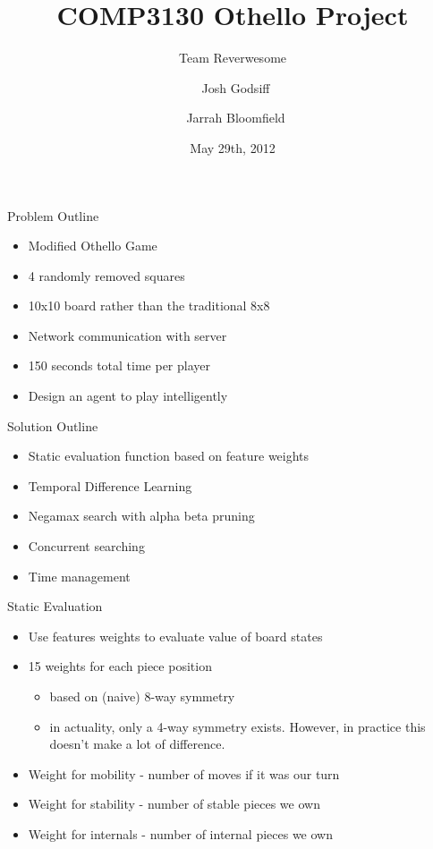 \documentclass{beamer}
\title[Team Reverwesome: Othello Bot] %
{COMP3130 Othello Project}
\subtitle
{Team Reverwesome} %
\author[Josh Godsiff, Jarrah Bloomfield] %
{~Josh Godsiff \and ~Jarrah Bloomfield}
\date[Short Occasion] %
{May 29th, 2012}
\begin{document}
\begin{frame}
  \titlepage
\end{frame}

\begin{frame}{Problem Outline}
    \begin{itemize}
  \item
    Modified Othello Game
  \item
    4 randomly removed squares
  \item
    10x10 board rather than the traditional 8x8
  \item
    Network communication with server
  \item
    150 seconds total time per player
  \item
    Design an agent to play intelligently
  \end{itemize}
\end{frame}

\begin{frame}{Solution Outline}
    \begin{itemize}
  \item
    Static evaluation function based on feature weights
  \item
    Temporal Difference Learning
  \item
    Negamax search with alpha beta pruning
  \item
    Concurrent searching
  \item
    Time management
  \end{itemize}
\end{frame}

\begin{frame}{Static Evaluation}
    \begin{itemize}
  \item
    Use features weights to evaluate value of board states
  \item
    15 weights for each piece position
	\begin{itemize}
		\item based on (naive) 8-way symmetry
		\item in actuality, only a 4-way symmetry exists. However, in practice this doesn't make a lot of difference.
	\end{itemize}
  \item
    Weight for mobility - number of moves if it was our turn
  \item
   Weight for stability - number of stable pieces we own
  \item
   Weight for internals - number of internal pieces we own
  \end{itemize}
\end{frame}
\end{document}

